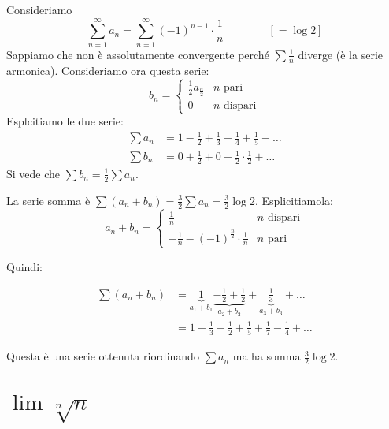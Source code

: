 \begin{example}
Consideriamo
\begin{equation*}
\sum_{n=1}^\infty a_n = \sum_{n=1}^\infty (-1)^{n-1} \cdot \frac{1}{n} \qquad \qquad [ = \log2]
\end{equation*}
Sappiamo che non è assolutamente convergente perché $\sum \frac{1}{n}$ diverge (è la serie armonica). Consideriamo ora questa serie:
\begin{equation*}
b_n = \begin{cases}
\frac{1}{2} a_{\frac{n}{2}} & n\mbox{ pari} \\
0 & n \mbox{ dispari}
\end{cases}
\end{equation*}
Esplcitiamo le due serie:
\begin{align*}
\sum a_n &= 1 - \frac{1}{2} + \frac{1}{3} - \frac{1}{4} + \frac{1}{5} - \ldots \\
\sum b_n &= 0 + \frac{1}{2} + 0 - \frac{1}{2} \cdot \frac{1}{2} + \ldots
\end{align*}
Si vede che $\sum b_n = \frac{1}{2} \sum a_n$. 

La serie somma è $\sum (a_n+b_n) = \frac{3}{2} \sum a_n = \frac{3}{2} \log 2$. Esplicitiamola:
\begin{equation*}
a_n + b_n = \begin{cases}
\frac{1}{n} & n\mbox{ dispari} \\
-\frac{1}{n} - (-1)^{\frac{n}{2}} \cdot \frac{1}{n} & n \mbox{ pari}
\end{cases}
\end{equation*}

Quindi:

\begin{align*}
\sum (a_n+b_n) &= \underbrace{1}_{a_1+b_1} \underbrace{-\frac{1}{2} + \frac{1}{2}}_{a_2+b_2} + \underbrace{\frac{1}{3}}_{a_3+b_3} + \ldots \\
&= 1 + \frac{1}{3} - \frac{1}{2} + \frac{1}{5} + \frac{1}{7} - \frac{1}{4} + \ldots
\end{align*}

Questa è una serie ottenuta riordinando $\sum a_n$ ma ha somma $\frac{3}{2} \log 2$.
\end{example}

\section{$\lim \sqrt[n]{n}$}

